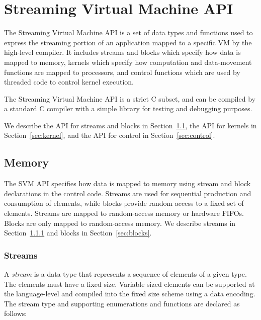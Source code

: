 \section{Streaming Virtual Machine API}

The Streaming Virtual Machine API is a set of data types and functions used to express the streaming portion of an application mapped to a specific VM by the high-level compiler. It includes streams and blocks which specify how data is mapped to memory, kernels which specify how computation and data-movement functions are mapped to processors, and control functions which are used by threaded code to control kernel execution.

The Streaming Virtual Machine API is a strict C subset, and can be compiled by a standard C compiler with 
a simple library for testing and debugging purposes.

We describe the API for streams and blocks in Section~\ref{sec:memory}, the API for kernels in Section~\ref{sec:kernel}, and the API for control in Section~\ref{sec:control}.

\subsection{Memory}
\label{sec:memory}

The SVM API specifies how data is mapped to memory using stream and block declarations in the control code.  Streams are used for sequential production and consumption of elements, while blocks provide random access to a fixed set of elements.  Streams are mapped to random-access memory or hardware FIFOs. Blocks are only mapped to random-access memory. We describe streams in Section~\ref{sec:streams} and blocks in Section~\ref{sec:blocks}.

\subsubsection{Streams}
\label{sec:streams}

A {\it stream} is a data type that represents a sequence of elements of a given type. 
The elements must have a fixed size. Variable sized elements can be supported at the language-level and compiled into the fixed size scheme using a data encoding. The stream type and supporting enumerations and functions are declared as follows:

